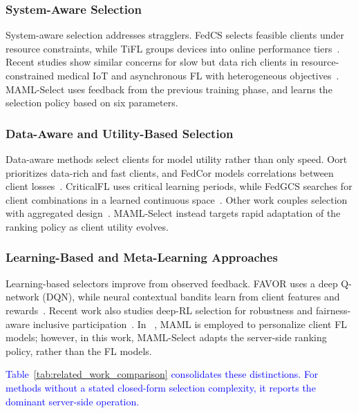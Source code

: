 \documentclass[journal]{IEEEtran}
\newcommand{\revision}[1]{\textcolor{blue}{#1}}
\begin{document}
\subsubsection{System-Aware Selection}
System-aware selection addresses stragglers. FedCS selects feasible clients under resource constraints, while TiFL groups devices into online performance tiers~\cite{nishio2019client,chai2020tifl}. Recent studies show similar concerns for slow but data rich clients in resource-constrained medical IoT and asynchronous FL with heterogeneous objectives~\cite{tapwal2026stragglers,forootani2026asynchronous}. MAML-Select uses feedback from the previous training phase, and learns the selection policy based on six parameters. %

\subsubsection{Data-Aware and Utility-Based Selection}
Data-aware methods select clients for model utility rather than only speed. Oort prioritizes data-rich and fast clients, and FedCor models correlations between client losses~\cite{lai2021oort,tang2022fedcor}. CriticalFL uses critical learning periods, while FedGCS searches for client combinations in a learned continuous space~\cite{yan2023criticalfl,ning2024fedgcs}. Other work couples selection with aggregated design~\cite{xu2024federated,tran2026fedimp}. MAML-Select instead targets rapid adaptation of the ranking policy as client utility evolves.

\subsubsection{Learning-Based and Meta-Learning Approaches}
Learning-based selectors improve from observed feedback. FAVOR uses a deep Q-network (DQN), while neural contextual bandits learn from client features and rewards~\cite{wang2020optimizing,pan2024contextual}. Recent work also studies deep-RL selection for robustness and fairness-aware inclusive participation~\cite{kazemi2026robust,arisdakessian2026vox}. In ~\cite{fallah2020personalized}, MAML is employed to personalize client FL models; however, in this work, MAML-Select adapts the server-side ranking policy, rather than the FL models.

\revision{Table~\ref{tab:related_work_comparison} consolidates these distinctions. For methods without a stated closed-form selection complexity, it reports the dominant server-side operation.}
\end{document}
